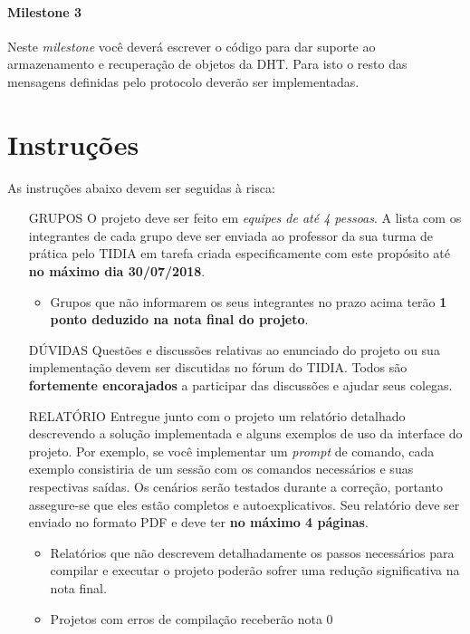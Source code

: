 \documentclass[oneside,12pt,a4paper]{article}
\begin{document}
\paragraph{Milestone 3}
Neste \emph{milestone} você deverá escrever o código para dar suporte
ao armazenamento e recuperação de objetos da DHT. Para isto o resto
das mensagens definidas pelo protocolo deverão ser implementadas.


\section{Instruções}

As instruções abaixo devem ser seguidas à risca:

\begin{enumerate}
\item[GRUPOS] O projeto deve ser feito em \emph{equipes de até 4
    pessoas}. A lista com os integrantes de cada grupo deve ser
  enviada ao professor da sua turma de prática pelo TIDIA em tarefa
  criada especificamente com este propósito até \textbf{no máximo dia
    30/07/2018}.
  \begin{itemize}
  \item Grupos que não informarem os seus integrantes no prazo acima
    terão \textbf{1 ponto deduzido na nota final do projeto}.
  \end{itemize}

\item[DÚVIDAS] Questões e discussões relativas ao enunciado do
  projeto ou sua implementação devem ser discutidas no fórum do
  TIDIA. Todos são \textbf{fortemente encorajados} a participar das
  discussões e ajudar seus colegas.

\item[RELATÓRIO] Entregue junto com o projeto um relatório detalhado descrevendo
  a solução implementada e alguns exemplos de uso da interface do
  projeto. Por exemplo, se você implementar um \textit{prompt} de
  comando, cada exemplo consistiria de um sessão com os comandos
  necessários e suas respectivas saídas. Os cenários serão testados
  durante a correção, portanto assegure-se que eles estão completos e
  autoexplicativos. Seu relatório deve ser enviado no formato PDF e
  deve ter \textbf{no máximo 4 páginas}.
  \begin{itemize}
  \item Relatórios que não descrevem detalhadamente os passos
    necessários para compilar e executar o projeto poderão sofrer uma
    redução significativa na nota final.
  \item Projetos com erros de compilação receberão nota 0
  \end{itemize}


\end{enumerate}
\end{document}

